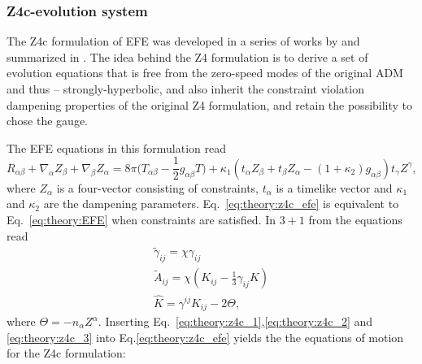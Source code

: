 \subsubsection{Z4c-evolution system}

The Z4c formulation of \ac{EFE} was developed in a series of works by \citet{Bernuzzi:2009ex,Ruiz:2010qj,Weyhausen:2011cg,Cao:2011fu,Hilditch:2012fp} and 
summarized in \citet{Hilditch:2012fp}. 
%
The idea behind the Z4 formulation is to derive a set of evolution equations that is free from the 
zero-speed modes of the original \ac{ADM} and thus -- strongly-hyperbolic,
and also inherit the constraint violation dampening properties of the original Z4 formulation, and retain the possibility to chose the gauge.

The \ac{EFE} equations in this formulation read 
%
\begin{equation}
    R_{\alpha\beta} + \nabla_{\alpha}Z_{\beta} + \nabla_{\beta}Z_{\alpha} = 8\pi \Big( T_{\alpha\beta} - \frac{1}{2}g_{\alpha\beta}T \Big) + \kappa_1 (t_{\alpha} Z_{\beta} + t_{\beta}Z_{\alpha} - (1+\kappa_2)g_{\alpha\beta})t_{\gamma}Z^{\gamma},
    \label{eq:theory:z4c_efe}
\end{equation}
%
where $Z_{\alpha}$ is a four-vector consisting of constraints, $t_{\alpha}$ is a timelike vector and 
$\kappa_1$ and $\kappa_2$ are the dampening parameters.
Eq.~\eqref{eq:theory:z4c_efe} is equivalent to Eq.~\eqref{eq:theory:EFE} when constraints are satisfied.
%
In $3+1$ from the equations read 
\begin{subequations}
\begin{align}
    \widetilde{\gamma}_{ij} = \chi\gamma_{ij} \label{eq:theory:z4c_1}\\
    \widetilde{A}_{ij} = \chi(K_{ij}-\frac{1}{3}\gamma_{ij}K)\label{eq:theory:z4c_2} \\
    \hat{K} = \gamma^{ij}K_{ij} - 2\Theta,\label{eq:theory:z4c_3}
\end{align}
\end{subequations}
%
where $\Theta=-n_{\alpha}Z^{\alpha}$.
%
Inserting Eq.~\eqref{eq:theory:z4c_1},\eqref{eq:theory:z4c_2} and \eqref{eq:theory:z4c_3} into
Eq.\eqref{eq:theory:z4c_efe} yields the 
the equations of motion for the Z4c formulation:
%
